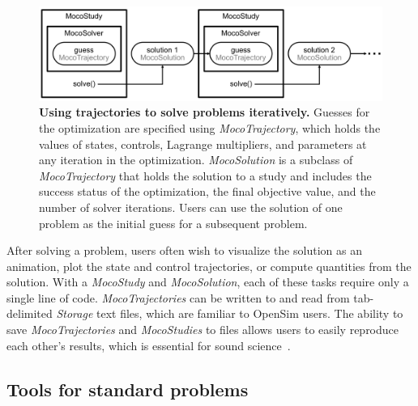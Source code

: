 \documentclass[10pt,letterpaper]{article}
\begin{document}
\begin{figure}[!h]
    \centering
    \includegraphics{../figures/MocoSolverDiagram.png}
    \caption{{\bf Using trajectories to solve problems iteratively.}
    Guesses for the optimization are specified using \textit{MocoTrajectory}, which holds the values of states, controls, Lagrange multipliers, and parameters at any iteration in the optimization. \textit{MocoSolution} is a subclass of \textit{MocoTrajectory} that holds the solution to a study and includes the success status of the optimization, the final objective value, and the number of solver iterations. Users can use the solution of one problem as the initial guess for a subsequent problem.
    }
    \label{mocosolverdiagram}
\end{figure}

After solving a problem, users often wish to visualize the solution as an animation, plot the state and control trajectories, or compute quantities from the solution. With a \textit{MocoStudy} and \textit{MocoSolution}, each of these tasks require only a single line of code. \textit{MocoTrajectories} can be written to and read from tab-delimited \textit{Storage} text files, which are familiar to OpenSim users. The ability to save \textit{MocoTrajectories} and \textit{MocoStudies} to files allows users to easily reproduce each other’s results, which is essential for sound science~\cite{Peng:2011}.

\subsection*{Tools for standard problems}
\end{document}
